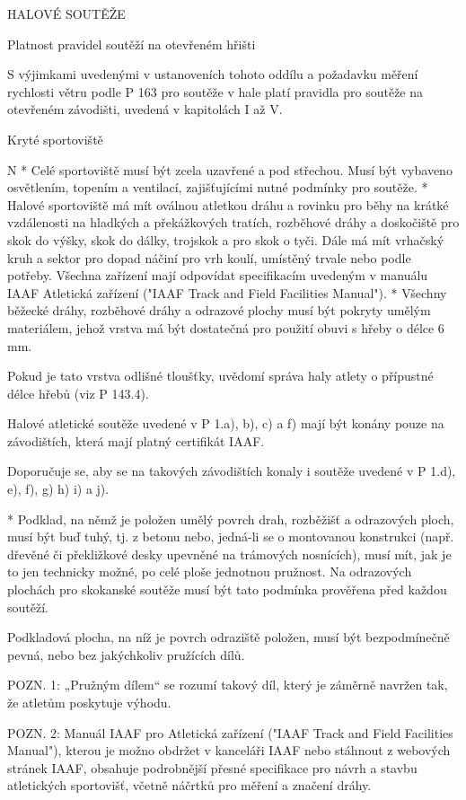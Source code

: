 \sec HALOVÉ SOUTĚŽE

\secc Platnost pravidel soutěží na otevřeném hřišti

S výjimkami uvedenými v ustanoveních tohoto oddílu a požadavku měření rychlosti větru podle P 163 pro soutěže v hale platí pravidla pro soutěže na otevřeném závodišti, uvedená v kapitolách I až V.

\secc Kryté sportoviště

\begitems \style N
* Celé sportoviště musí být zcela uzavřené a pod střechou. Musí být vybaveno osvětlením, topením a ventilací, zajišťujícími nutné podmínky pro soutěže.
* Halové sportoviště má mít oválnou atletkou dráhu a rovinku pro běhy na krátké vzdálenosti na hladkých a překážkových tratích, rozběhové dráhy a doskočiště pro skok do výšky, skok do dálky, trojskok a pro skok o tyči. Dále má mít vrhačský kruh a sektor pro dopad náčiní pro vrh koulí, umístěný trvale nebo podle potřeby. Všechna zařízení mají odpovídat specifikacím uvedeným v manuálu IAAF Atletická zařízení ("IAAF Track and Field Facilities Manual").
* Všechny běžecké dráhy, rozběhové dráhy a odrazové plochy musí být pokryty umělým materiálem, jehož vrstva má být dostatečná pro použití obuvi s hřeby o délce 6 mm.

Pokud je tato vrstva odlišné tloušťky, uvědomí správa haly atlety o přípustné délce hřebů (viz P 143.4).

Halové atletické soutěže uvedené v P 1.a), b), c) a f) mají být konány pouze na závodištích, která mají platný certifikát IAAF.

Doporučuje se, aby se na takových závodištích konaly i soutěže uvedené v P 1.d), e), f), g) h) i) a j).

* Podklad, na němž je položen umělý povrch drah, rozběžišť a odrazových ploch, musí být buď tuhý, tj. z betonu nebo, jedná-li se o montovanou konstrukci (např. dřevěné či překližkové desky upevněné na trámových nosnících), musí mít, jak je to jen technicky možné, po celé ploše jednotnou pružnost. Na odrazových plochách pro skokanské soutěže musí být tato podmínka prověřena před každou soutěží.

Podkladová plocha, na níž je povrch odraziště položen, musí být bezpodmínečně pevná, nebo bez jakýchkoliv pružících dílů.

POZN. 1: „Pružným dílem“ se rozumí takový díl, který je záměrně navržen tak, že atletům poskytuje výhodu.

POZN. 2: Manuál IAAF pro Atletická zařízení ("IAAF Track and Field Facilities Manual"), kterou je možno obdržet v kanceláři IAAF nebo stáhnout z webových stránek IAAF, obsahuje podrobnější přesné specifikace pro návrh a stavbu atletických sportovišť, včetně náčrtků pro měření a značení dráhy.


